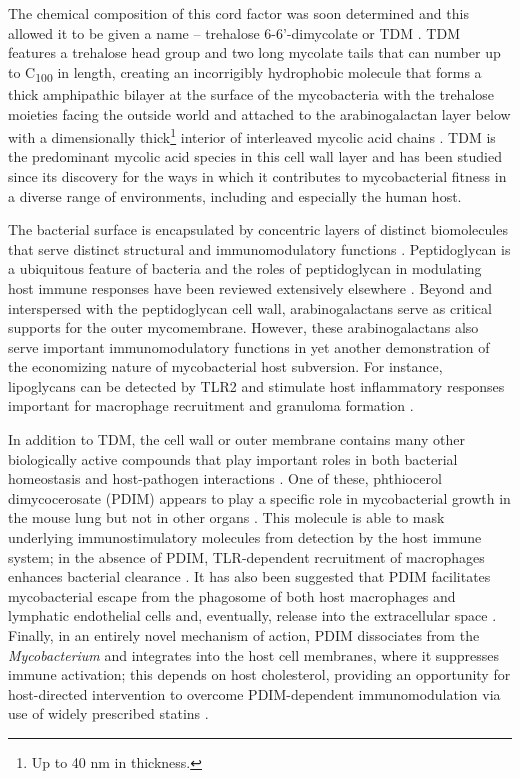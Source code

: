 The chemical composition of this cord factor was soon determined and this allowed it to be given a name -- trehalose 6\hyp{}6'\hyp{}dimycolate or TDM \citep{Noll1956a}. TDM features a trehalose head group and two long mycolate tails that can number up to C\textsubscript{100} in length, creating an incorrigibly hydrophobic molecule that forms a thick amphipathic bilayer at the surface of the mycobacteria with the trehalose moieties facing the outside world and attached to the arabinogalactan layer below with a dimensionally thick\footnote{Up to 40 nm in thickness.} interior of interleaved mycolic acid chains \citep{Glickman2008, Welsh2013, BansalMutalik2014, Adhyapak2020, Alderwick2015, Batt2020}. TDM is the predominant mycolic acid species in this cell wall layer and has been studied since its discovery for the ways in which it contributes to mycobacterial fitness in a diverse range of environments, including and especially the human host.

The bacterial surface is encapsulated by concentric layers of distinct biomolecules that serve distinct structural and immunomodulatory functions \citep{Neyrolles2011}. Peptidoglycan is a ubiquitous feature of bacteria and the roles of peptidoglycan in modulating host immune responses have been reviewed extensively elsewhere \citep{Kang1998a, Guan2007, Wolf2018}. Beyond and interspersed with the peptidoglycan cell wall, arabinogalactans serve as critical supports for the outer mycomembrane. However, these arabinogalactans also serve important immunomodulatory functions in yet another demonstration of the economizing nature of mycobacterial host subversion. For instance, lipoglycans can be detected by TLR2 and stimulate host inflammatory responses important for macrophage recruitment and granuloma formation \citep{Gilleron2006}.

In addition to TDM, the cell wall or outer membrane contains many other biologically active compounds that play important roles in both bacterial homeostasis and host\hyp{}pathogen interactions \citep{Yu2012, Alderwick2015, Rens2021}. One of these, phthiocerol dimycocerosate (PDIM) appears to play a specific role in mycobacterial growth in the mouse lung but not in other organs \citep{Cox1999}. This molecule is able to mask underlying immunostimulatory molecules from detection by the host immune system; in the absence of PDIM, TLR\hyp{}dependent recruitment of macrophages enhances bacterial clearance \citep{Cambier2014b, Day2014}. It has also been suggested that PDIM facilitates mycobacterial escape from the phagosome of both host macrophages and lymphatic endothelial cells and, eventually, release into the extracellular space \citep{Quigley2017, Lerner2018}. Finally, in an entirely novel mechanism of action, PDIM dissociates from the \textit{Mycobacterium} and integrates into the host cell membranes, where it suppresses immune activation; this depends on host cholesterol, providing an opportunity for host\hyp{}directed intervention to overcome PDIM\hyp{}dependent immunomodulation via use of widely prescribed statins \citep{Cambier2020}.

